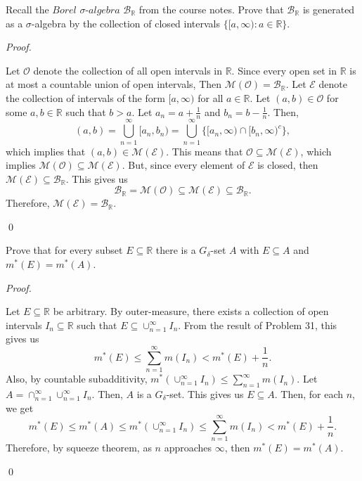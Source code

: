 \documentclass[12pt]{article}
\newenvironment{problem}[2][Problem]{\begin{trivlist}
\item[\hskip \labelsep {\bfseries #1}\hskip \labelsep {\bfseries
#2.}]}{\end{trivlist}}
\newenvironment{sol}
    {\emph{Proof.}
    }
    {
    \qed
    }
\begin{document}
\begin{problem}{33}
  Recall the $\textit{Borel } \sigma\textit{-algebra}$ $\mathcal{B}_\mathbb{R}$ from the course notes. Prove that $\mathcal{B}_\mathbb{R}$ is generated as a $\sigma$-algebra by the collection of closed intervals $\{[a,\infty) : a \in \mathbb{R}\}$.
  \end{problem}
  \begin{sol}
  Let $\mathcal{O}$ denote the collection of all open intervals in $\mathbb{R}$. Since every open set in $\mathbb{R}$ is at most a countable union of open intervals, Then $\mathcal{M}(\mathcal{O}) = \mathcal{B}_\mathbb{R}$. Let $\mathcal{E}$ denote the collection of intervals of the form $[a,\infty)$ for all $a \in \mathbb{R}$. Let $(a,b) \in \mathcal{O}$ for some $a,b \in \mathbb{R}$ such that $b > a$. Let $a_n = a + \frac{1}{n}$ and $b_n = b - \frac{1}{n}$. Then, $$(a,b) = \bigcup_{n = 1}^\infty[a_n,b_n) = \bigcup_{n = 1}^\infty \{[a_n,\infty) \cap [b_n,\infty)^c\},$$ which implies that $(a,b) \in \mathcal{M}(\mathcal{E})$. This means that $\mathcal{O} \subseteq \mathcal{M}(\mathcal{E})$, which implies $\mathcal{M}(\mathcal{O}) \subseteq \mathcal{M}(\mathcal{E})$. But, since every element of $\mathcal{E}$ is closed, then $\mathcal{M}(\mathcal{E}) \subseteq \mathcal{B}_\mathbb{R}$. This gives us $$\mathcal{B}_\mathbb{R} = \mathcal{M}(\mathcal{O}) \subseteq \mathcal{M}(\mathcal{E}) \subseteq \mathcal{B}_\mathbb{R}.$$ Therefore, $\mathcal{M}(\mathcal{E}) = \mathcal{B}_\mathbb{R}$.
  \end{sol}
  
  
  
  \begin{problem}{34}
  Prove that for every subset $E \subseteq \mathbb{R}$ there is a $G_\delta$-set $A$ with $E \subseteq A$ and $m^*(E) = m^*(A)$.
  \end{problem}
  
  \begin{sol}
  Let $E \subseteq \mathbb{R}$ be arbitrary. By outer-measure, there exists a collection of open intervals $I_n \subseteq \mathbb{R}$ such that $E \subseteq \cup_{n = 1}^\infty I_n$. From the result of Problem 31, this gives us $$m^*(E) \leq \sum_{n = 1}^\infty m(I_n) < m^*(E) + \frac{1}{n}.$$ Also, by countable subadditivity, $m^*(\cup_{n = 1}^\infty I_n) \leq \sum_{n = 1}^\infty m(I_n)$. Let $A = \cap_{n = 1}^\infty \cup_{n = 1}^\infty I_n$. Then, $A$ is a $G_\delta$-set. This gives us $E \subseteq A$. Then, for each $n$, we get $$m^*(E) \leq m^*(A) \leq m^*(\cup_{n = 1}^\infty I_n) \leq \sum_{n = 1}^\infty m(I_n) < m^*(E) + \frac{1}{n}.$$ Therefore, by squeeze theorem, as $n$ approaches $\infty$, then $m^*(E) = m^*(A)$.
  \end{sol}
  
\end{document}
